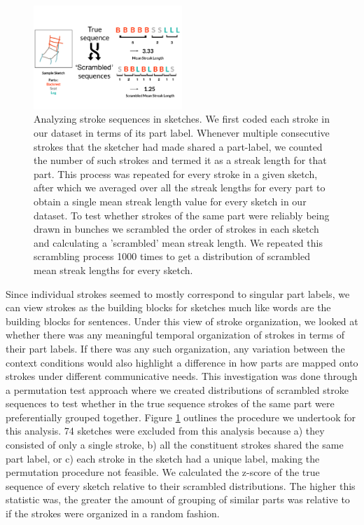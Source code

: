 \documentclass[10pt,letterpaper]{article}
\begin{document}
\begin{figure}
\centering
\includegraphics[width=0.5\textwidth]{figures/Part_sequence.png}
\caption{Analyzing stroke sequences in sketches. We first coded each stroke in our dataset in terms of its part label. Whenever multiple consecutive strokes that the sketcher had made shared a part-label, we counted the number of such strokes and termed it as a streak length for that part. This process was repeated for every stroke in a given sketch, after which we averaged over all the streak lengths for every part to obtain a single mean streak length value for every sketch in our dataset. To test whether strokes of the same part were reliably being drawn in bunches we scrambled the order of strokes in each sketch and calculating a 'scrambled' mean streak length. We repeated this scrambling process 1000 times to get a distribution of scrambled mean streak lengths for every sketch.}
\label{stroke_sequence_fig}
\end{figure}

Since individual strokes seemed to mostly correspond to singular part labels, we can view strokes as the building blocks for sketches much like words are the building blocks for sentences. Under this view of stroke organization, we looked at whether there was any meaningful temporal organization of strokes in terms of their part labels. If there was any such organization, any variation between the context conditions would also highlight a difference in how parts are mapped onto strokes under different communicative needs. This investigation was done through a permutation test approach where we created distributions of scrambled stroke sequences to test whether in the true sequence strokes of the same part were preferentially grouped together. Figure \ref{stroke_sequence_fig} outlines the procedure we undertook for this analysis.
74 sketches were excluded from this analysis because a) they consisted of only a single stroke, b) all the constituent strokes shared the same part label, or c) each stroke in the sketch had a unique label, making the permutation procedure not feasible.
We calculated the z-score of the true sequence of every sketch relative to their scrambled distributions. The higher this statistic was, the greater the amount of grouping of similar parts was relative to if the strokes were organized in a random fashion.
\end{document}
